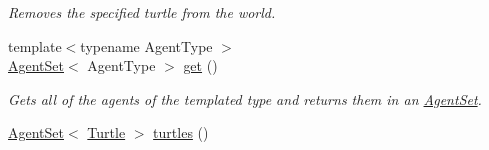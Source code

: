 \begin{DoxyCompactItemize}
\begin{DoxyCompactList}\small\item\em Removes the specified turtle from the world. \end{DoxyCompactList}\item 
{\footnotesize template$<$typename Agent\-Type $>$ }\\\hyperlink{classrepast_1_1relogo_1_1_agent_set}{Agent\-Set}$<$ Agent\-Type $>$ \hyperlink{classrepast_1_1relogo_1_1_observer_adc2973bf611da5b3150241767ea0aaf4}{get} ()
\begin{DoxyCompactList}\small\item\em Gets all of the agents of the templated type and returns them in an \hyperlink{classrepast_1_1relogo_1_1_agent_set}{Agent\-Set}. \end{DoxyCompactList}\item 
\hypertarget{classrepast_1_1relogo_1_1_observer_a801236adc73230ae18d3f52c88462c16}{\hyperlink{classrepast_1_1relogo_1_1_agent_set}{Agent\-Set}$<$ \hyperlink{classrepast_1_1relogo_1_1_turtle}{Turtle} $>$ \hyperlink{classrepast_1_1relogo_1_1_observer_a801236adc73230ae18d3f52c88462c16}{turtles} ()}\label{classrepast_1_1relogo_1_1_observer_a801236adc73230ae18d3f52c88462c16}


\end{DoxyCompactItemize}
